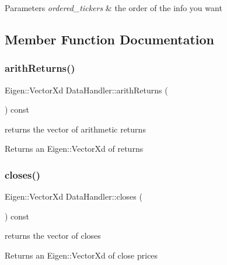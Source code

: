 \begin{DoxyParams}{Parameters}
{\em ordered\+\_\+tickers} & the order of the info you want \\
\hline
\end{DoxyParams}


\subsection{Member Function Documentation}
\mbox{\label{classDataHandler_a4d9a0013b6d2d3efa04e6e47b58b6eea}} 
\subsubsection{\texorpdfstring{arith\+Returns()}{arithReturns()}}
{\footnotesize\ttfamily Eigen\+::\+Vector\+Xd Data\+Handler\+::arith\+Returns (\begin{DoxyParamCaption}{ }\end{DoxyParamCaption}) const}



returns the vector of arithmetic returns 

\begin{DoxyReturn}{Returns}
an Eigen\+::\+Vector\+Xd of returns 
\end{DoxyReturn}
\mbox{\label{classDataHandler_a18f429318b33936acaff563835729e1c}} 
\subsubsection{\texorpdfstring{closes()}{closes()}}
{\footnotesize\ttfamily Eigen\+::\+Vector\+Xd Data\+Handler\+::closes (\begin{DoxyParamCaption}{ }\end{DoxyParamCaption}) const}



returns the vector of closes 

\begin{DoxyReturn}{Returns}
an Eigen\+::\+Vector\+Xd of close prices 
\end{DoxyReturn}
\mbox{\label{classDataHandler_a94ccb9422f3f7d50ad07c3a0553baab9}} 
